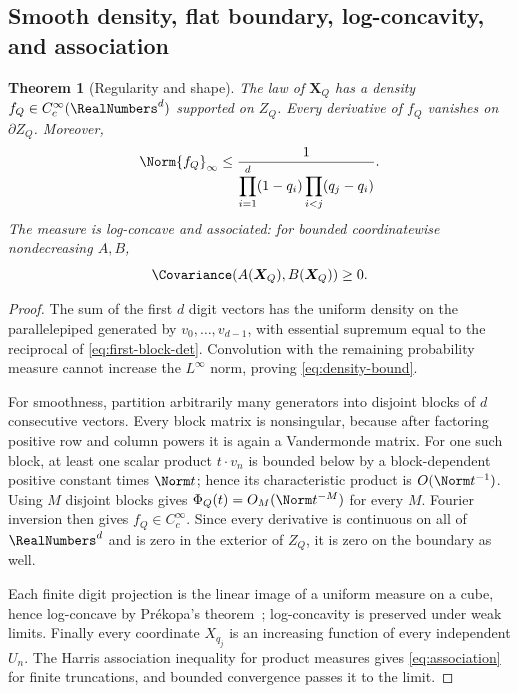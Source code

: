 \documentclass[11pt,a4paper]{article}
\newtheorem{theorem}{Theorem}[section]
\theoremstyle{definition}
\theoremstyle{remark}
\newcommand{\vct}[1]{\boldsymbol{#1}}
\begin{document}
\subsection{Smooth density, flat boundary, log-concavity, and association}

\begin{theorem}[Regularity and shape]
\label{thm:density-regularity}
The law of $\vct X_Q$ has a density $f_Q\in C_c^\infty(\RealNumbers^d)$ supported on $Z_Q$.  Every derivative of $f_Q$ vanishes on $\partial Z_Q$.  Moreover,
\begin{equation}
  \Norm{f_Q}_{\infty}
  \le
  \frac{1}{\displaystyle
    \prod_{i=1}^d(1-q_i)
    \prod_{i<j}(q_j-q_i)}.
  \label{eq:density-bound}
\end{equation}
The measure is log-concave and associated: for bounded coordinatewise nondecreasing $A,B$,
\begin{equation}
  \Covariance(A(\vct X_Q),B(\vct X_Q))\ge0.
  \label{eq:association}
\end{equation}
\end{theorem}

\begin{proof}
The sum of the first $d$ digit vectors has the uniform density on the parallelepiped generated by $v_0,\ldots,v_{d-1}$, with essential supremum equal to the reciprocal of \eqref{eq:first-block-det}.  Convolution with the remaining probability measure cannot increase the $L^\infty$ norm, proving \eqref{eq:density-bound}.

For smoothness, partition arbitrarily many generators into disjoint blocks of $d$ consecutive vectors.  Every block matrix is nonsingular, because after factoring positive row and column powers it is again a Vandermonde matrix.  For one such block, at least one scalar product $t\cdot v_n$ is bounded below by a block-dependent positive constant times $\Norm t$; hence its characteristic product is $O(\Norm t^{-1})$.  Using $M$ disjoint blocks gives $\Phi_Q(t)=O_M(\Norm t^{-M})$ for every $M$.  Fourier inversion then gives $f_Q\in C_c^\infty$.  Since every derivative is continuous on all of $\RealNumbers^d$ and is zero in the exterior of $Z_Q$, it is zero on the boundary as well.

Each finite digit projection is the linear image of a uniform measure on a cube, hence log-concave by Pr\'ekopa's theorem~\cite{Prekopa}; log-concavity is preserved under weak limits.  Finally every coordinate $X_{q_j}$ is an increasing function of every independent $U_n$.  The Harris association inequality for product measures gives \eqref{eq:association} for finite truncations, and bounded convergence passes it to the limit.
\end{proof}
\end{document}
